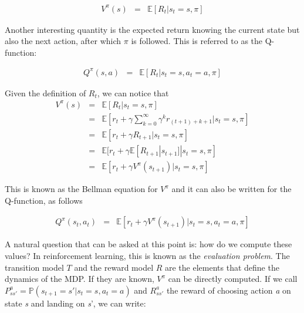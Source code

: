 					\begin{eqnarray}
						V^{\pi} (s) & = & \mathbb{E} [R_t | s_t = s, \pi] \label{eq:valuefunc}
					\end{eqnarray}
            
      	Another interesting quantity is the expected return knowing the current state but also the next action, after which $\pi$ is followed. This is referred to as the Q-function:
					
					\begin{eqnarray}
						Q^{\pi} (s,a) & = & \mathbb{E} [R_t | s_t = s, a_t = a, \pi] \label{eq:qfunc}
					\end{eqnarray}
            
       	Given the definition of $R_t$, we can notice that 
        \begin{eqnarray}
          	V^{\pi} (s)   & = & \mathbb{E} [R_t | s_t = s, \pi] \nonumber \\
           	& = & \mathbb{E} [r_t + \gamma \sum_{k=0}^\infty \gamma^k r_{(t+1)+k+1} | s_t = s, \pi] \nonumber \\
            & = & \mathbb{E} [r_t + \gamma R_{t+1} | s_t = s, \pi] \nonumber \\
						& = & \mathbb{E} [r_t + \gamma \mathbb{E} [R_{t+1}|s_{t+1}] | s_t = s, \pi] \nonumber \\
            & = & \mathbb{E} [r_t + \gamma V^{\pi} (s_{t+1}) | s_t = s, \pi] \label{eq:vbellman}
        \end{eqnarray}
            
     	This is known as the Bellman equation for $V^{\pi}$ and it can also be written for the Q-function, as follows
					
					\begin{eqnarray}
						Q^{\pi} (s_t,a_t) & = & \mathbb{E} [r_t + \gamma V^{\pi} (s_{t+1}) | s_t = s, a_t = a, \pi] \label{eq:qbellman}
					\end{eqnarray}
            
       	A natural question that can be asked at this point is: how do we compute these values? In reinforcement learning, this is known as the \textit{evaluation problem}. The transition model $T$ and the reward model $R$ are the elements that define the dynamics of the MDP. If they are known, $V^{\pi}$ can be directly computed. If we call $P_{ss'}^a = \mathbb{P} (s_{t+1} = s' | s_t = s, a_t = a)$ and $R_{ss'}^a$ the reward of choosing action \textit{a} on state \textit{s} and landing on \textit{s}', we can write:
        
